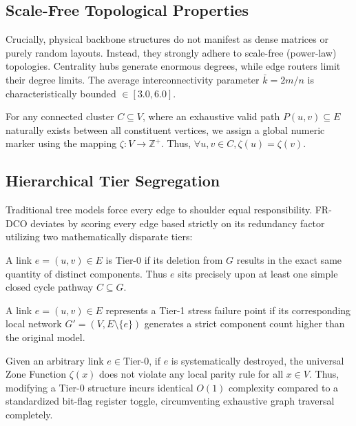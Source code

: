 \documentclass[runningheads]{llncs}
\begin{document}
\subsection{Scale-Free Topological Properties}
Crucially, physical backbone structures do not manifest as dense matrices or purely random layouts. Instead, they strongly adhere to scale-free (power-law) topologies. Centrality hubs generate enormous degrees, while edge routers limit their degree limits. The average interconnectivity parameter $\bar{k} = 2m/n$ is characteristically bounded $\in [3.0, 6.0]$.

\begin{definition}
For any connected cluster $C \subseteq V$, where an exhaustive valid path $P(u, v) \subseteq E$ naturally exists between all constituent vertices, we assign a global numeric marker using the mapping $\zeta: V \to \mathbb{Z}^+$. Thus, $\forall u,v \in C, \zeta(u) = \zeta(v)$.
\end{definition}

\subsection{Hierarchical Tier Segregation}
Traditional tree models force every edge to shoulder equal responsibility. FR-DCO deviates by scoring every edge based strictly on its redundancy factor utilizing two mathematically disparate tiers:

\begin{definition}
A link $e = (u,v) \in E$ is Tier-0 if its deletion from $G$ results in the exact same quantity of distinct components. Thus $e$ sits precisely upon at least one simple closed cycle pathway $C \subseteq G$.
\end{definition}

\begin{definition}
A link $e = (u,v) \in E$ represents a Tier-1 stress failure point if its corresponding local network $G' = (V, E \setminus \{e\})$ generates a strict component count higher than the original model. 
\end{definition}

\begin{theorem}
Given an arbitrary link $e \in \text{Tier-0}$, if $e$ is systematically destroyed, the universal Zone Function $\zeta(x)$ does not violate any local parity rule for all $x \in V$. Thus, modifying a Tier-0 structure incurs identical $O(1)$ complexity compared to a standardized bit-flag register toggle, circumventing exhaustive graph traversal completely. 
\end{theorem}
\end{document}
